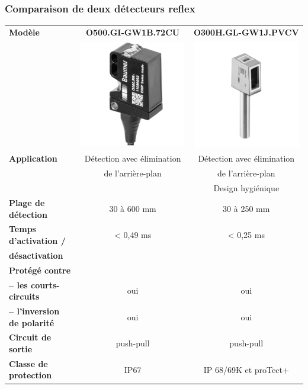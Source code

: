 \documentclass{article}
\begin{document}
    \subsubsection{Comparaison de deux détecteurs reflex}
    \begin{table}[H]
        \centering
        \begin{tabular}{l|c|c}
        \textbf{Modèle}
            & \textbf{O500.GI-GW1B.72CU}
            & \textbf{O300H.GL-GW1J.PVCV}\\
            & \includegraphics[width=0.2\linewidth]{./images/detect-reflex-A.png}
            & \includegraphics[width=0.2\linewidth]{./images/detect-reflex-B.png}\\
        \hline
        \textbf{Application}            & Détection avec élimination    & Détection avec élimination    \\
                                        & de l'arrière-plan             & de l'arrière-plan             \\
                                        &                               & Design hygiénique             \\
        \hline
        \textbf{Plage de détection}     & 30 à 600 mm                   & 30 à 250 mm                   \\
        \hline
        \textbf{Temps d'activation / }  & < 0,49 ms                     & < 0,25 ms                     \\
        \textbf{désactivation}          & & \\
        \hline
        \textbf{Protégé contre}         & & \\
        \textbf{-- les courts-circuits} & oui & oui \\
        \textbf{-- l'inversion de polarité} & oui & oui \\
        \hline
        \textbf{Circuit de sortie}      & push-pull                     & push-pull                     \\
        \hline
        \textbf{Classe de protection}   & IP67                          & IP 68/69K et proTect+         \\
    \end{tabular}
    \end{table}
\end{document}
